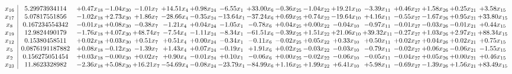 \documentclass[9pt]{article}
\begin{document}
 \[\begin{array}{c| c c@{\hskip 2pt} c@{\hskip 2pt} c@{\hskip 2pt} c@{\hskip 2pt} c@{\hskip 2pt} c@{\hskip 2pt} c@{\hskip 2pt} c@{\hskip 2pt} c@{\hskip 2pt} c@{\hskip 2pt} c@{\hskip 2pt} c@{\hskip 2pt} c@{\hskip 2pt} c@{\hskip 2pt} c@{\hskip 2pt} }
 x_{16}   &  5.29973934114 & +  0.47 x_{18} & -1.04 x_{30} & -1.01 x_{7} & + 14.51 x_{4} & +  0.98 x_{24} & -6.55 x_{1} & + 33.00 x_{6} & -0.36 x_{25} & -1.04 x_{22} & + 19.21 x_{10} & -3.39 x_{11} & +  0.46 x_{27} & +  1.58 x_{26} & +  0.25 x_{21} & +  3.58 x_{15}\\
 x_{17}   &  5.07817551856 & -1.02 x_{18} & +  2.73 x_{30} & +  1.86 x_{7} & -28.66 x_{4} & -0.35 x_{24} & -13.64 x_{1} & -37.24 x_{6} & +  0.69 x_{25} & +  0.74 x_{22} & -19.64 x_{10} & +  4.16 x_{11} & -0.55 x_{27} & -1.67 x_{26} & +  0.95 x_{21} & + 33.80 x_{15}\\
 x_{8}   &  0.167234554342 & -0.01 x_{18} & +  0.08 x_{30} & -0.38 x_{7} & -1.21 x_{4} & +  0.04 x_{24} & -1.05 x_{1} & -0.78 x_{6} & +  0.04 x_{25} & +  0.00 x_{22} & -0.04 x_{10} & -0.97 x_{11} & -0.01 x_{27} & -0.03 x_{26} & -0.01 x_{21} & +  0.44 x_{15}\\
 x_{19}   &  12.9824490179 & -1.76 x_{18} & +  4.07 x_{30} & + 48.74 x_{7} & -7.54 x_{4} & -1.11 x_{24} & -8.34 x_{1} & -61.51 x_{6} & -0.39 x_{25} & +  1.51 x_{22} & + 21.06 x_{10} & + 39.32 x_{11} & -0.27 x_{27} & +  1.03 x_{26} & +  2.97 x_{21} & + 88.34 x_{15}\\
 x_{12}   &  0.15380458511 & +  0.02 x_{18} & +  0.03 x_{30} & +  0.51 x_{7} & +  0.51 x_{4} & +  0.00 x_{24} & -0.34 x_{1} & -0.11 x_{6} & -0.02 x_{25} & +  0.05 x_{22} & +  0.33 x_{10} & +  0.50 x_{11} & +  0.02 x_{27} & +  0.04 x_{26} & +  0.02 x_{21} & +  0.75 x_{15}\\
 x_{5}   &  0.0876191187882 & +  0.08 x_{18} & -0.12 x_{30} & -1.39 x_{7} & +  1.43 x_{4} & +  0.07 x_{24} & -0.19 x_{1} & +  1.91 x_{6} & +  0.02 x_{25} & -0.03 x_{22} & -0.03 x_{10} & -0.79 x_{11} & -0.02 x_{27} & +  0.06 x_{26} & -0.06 x_{21} & -1.55 x_{15}\\
 x_{2}   &  0.156275051454 & +  0.03 x_{18} & -0.00 x_{30} & +  0.02 x_{7} & +  0.90 x_{4} & -0.01 x_{24} & +  0.10 x_{1} & -0.06 x_{6} & +  0.00 x_{25} & -0.02 x_{22} & -0.06 x_{10} & -0.05 x_{11} & -0.04 x_{27} & +  0.05 x_{26} & +  0.00 x_{21} & +  0.46 x_{15}\\
 x_{23}   &  11.8623328982 & -2.36 x_{18} & +  5.08 x_{30} & + 16.21 x_{7} & -54.69 x_{4} & -0.08 x_{24} & -23.79 x_{1} & -84.99 x_{6} & +  1.16 x_{25} & +  1.99 x_{22} & +  6.41 x_{10} & +  5.98 x_{11} & -0.69 x_{27} & -1.39 x_{26} & +  1.56 x_{21} & + 83.49 x_{15}\\

\end{array}\]
\end{document}
